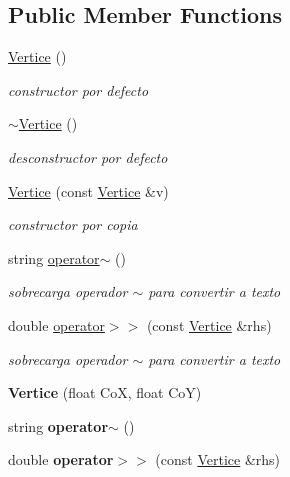 \subsection*{Public Member Functions}
\begin{DoxyCompactItemize}
\item 
\mbox{\label{class_vertice_a9dd7cf987cddf248b9d4e3d31bf8822b}} 
\hyperlink{class_vertice_a9dd7cf987cddf248b9d4e3d31bf8822b}{Vertice} ()
\begin{DoxyCompactList}\small\item\em constructor por defecto \end{DoxyCompactList}\item 
\mbox{\label{class_vertice_ae231694dc3ff35959b5b20b879b4678a}} 
\hyperlink{class_vertice_ae231694dc3ff35959b5b20b879b4678a}{$\sim$\+Vertice} ()
\begin{DoxyCompactList}\small\item\em desconstructor por defecto \end{DoxyCompactList}\item 
\hyperlink{class_vertice_a8d8f3610b706a9e5d50e1138d9abea90}{Vertice} (const \hyperlink{class_vertice}{Vertice} \&v)
\begin{DoxyCompactList}\small\item\em constructor por copia \end{DoxyCompactList}\item 
\mbox{\label{class_vertice_a3c83f2d25882d03116afbc39906bbf31}} 
string \hyperlink{class_vertice_a3c83f2d25882d03116afbc39906bbf31}{operator$\sim$} ()
\begin{DoxyCompactList}\small\item\em sobrecarga operador $\sim$ para convertir a texto \end{DoxyCompactList}\item 
\mbox{\label{class_vertice_a8bf2ff926bc43cba6342d9f57f930708}} 
double \hyperlink{class_vertice_a8bf2ff926bc43cba6342d9f57f930708}{operator$>$$>$} (const \hyperlink{class_vertice}{Vertice} \&rhs)
\begin{DoxyCompactList}\small\item\em sobrecarga operador $\sim$ para convertir a texto \end{DoxyCompactList}\item 
\mbox{\label{class_vertice_a9d05cab25c3df19e38d1413b8ea136d9}} 
{\bfseries Vertice} (float CoX, float CoY)
\item 
\mbox{\label{class_vertice_a3c83f2d25882d03116afbc39906bbf31}} 
string {\bfseries operator$\sim$} ()
\item 
\mbox{\label{class_vertice_a8bf2ff926bc43cba6342d9f57f930708}} 
double {\bfseries operator$>$$>$} (const \hyperlink{class_vertice}{Vertice} \&rhs)
\end{DoxyCompactItemize}
